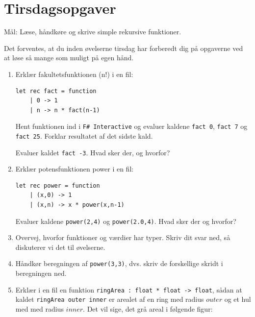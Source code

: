 \documentclass[a4paper,12pt]{article}
\newcommand{\fsi}{\texttt{F\# Interactive} }
\begin{document}
\newpage
\section{Tirsdagsopgaver}
\label{sec:tirsdagsopgaver}

Mål: Læse, håndkøre og skrive simple rekursive funktioner.

Det forventes, at du inden øvelserne tirsdag har forberedt dig på
opgaverne ved at løse så mange som muligt på egen hånd.

\begin{enumerate}[{1}T1]
 \item Erklær fakultetsfunktionen (n!) i en fil:
\begin{Verbatim}[baselinestretch=0.8]
let rec fact = function
    | 0 -> 1
    | n -> n * fact(n-1)
\end{Verbatim}

Hent funktionen ind i \fsi og evaluer kaldene \verb|fact 0|,
\verb|fact 7| og \verb|fact 25|. Forklar resultatet af det sidste
kald.

  Evaluer kaldet \verb|fact -3|. Hvad sker der, og hvorfor?
\item Erklær potensfunktionen power i en fil:
\begin{Verbatim}[baselinestretch=0.8]
let rec power = function
    | (x,0) -> 1
    | (x,n) -> x * power(x,n-1)
\end{Verbatim}
  Evaluer kaldene \verb|power(2,4)| og
  \verb|power(2.0,4)|. Hvad sker der og hvorfor?
\item Overvej, hvorfor funktioner og værdier har typer. Skriv dit svar ned, så diskuterer vi det til øvelserne.
\item Håndkør beregningen af \verb|power(3,3)|, dvs. skriv de
  forskellige skridt i beregningen ned.

\item Erklær i en fil en funktion \verb|ringArea : float * float -> float|, sådan at kaldet \verb|ringArea outer inner| er arealet af en ring med radius $\mathit{outer}$ og et hul med med radius $\mathit{inner}$. Det vil sige, det grå areal i følgende figur:
  \begin{center}
  \end{center}


\end{enumerate}
\end{document}
